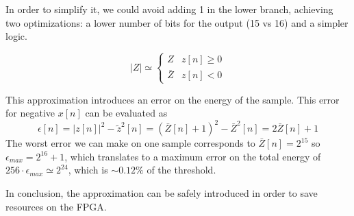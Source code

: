 In order to simplify it, we could avoid adding 1 in the lower branch, achieving 
two optimizations: a lower number of bits for the output (15 vs 16) and a 
simpler logic.

\begin{equation}
  |Z| \simeq \begin{cases}
    Z & z[n] \ge 0 \\
    \bar{Z} & z[n] < 0
  \end{cases}
\end{equation}

This approximation introduces an error on the energy of the sample. 
This error for negative $x[n]$ can be evaluated as
\begin{equation}
  \epsilon[n] = |z[n]|^2 - \tilde{z}^2[n] = (\bar{Z}[n] + 1)^2 - \bar{Z}^2[n] = 2\bar{Z}[n] + 1
\end{equation}
The worst error we can make on one sample corresponds to $\bar{Z}[n] = 2^{15}$
so $\epsilon_{max} = 2^{16}+1$, which translates to a maximum error on the total 
energy of $256 \cdot \epsilon_{max} \simeq 2^{24}$, which is $\sim 0.12\%$ of the 
threshold. 

In conclusion, the approximation can be safely introduced in order to save 
resources on the FPGA.



